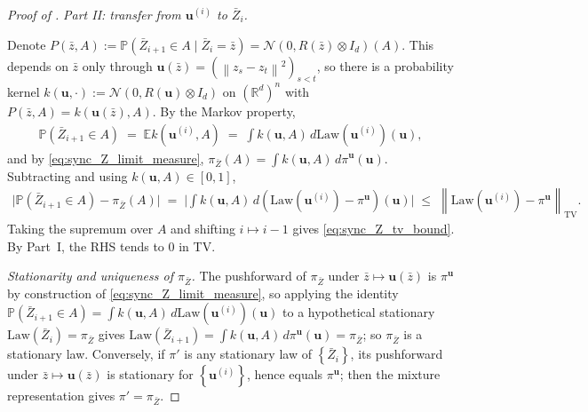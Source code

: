 \documentclass{article}
\newcommand{\RR}{\mathbb{R}}
\newcommand{\Prob}[1]{\mathbb{P}\left( #1 \right)}
\newcommand{\Set}[1]{\left\{ #1 \right\}}
\newcommand{\Exp}[1]{\mathbb{E} #1}
\newcommand{\norm}[1]{\left\|#1\right\|}
\newcommand{\cond}{\mid}
\newcommand{\mcN}{\mathcal{N}}
\newcommand{\bZ}{\bar{Z}}
\newcommand{\bz}{\bar{z}}
\newcommand{\bu}{\mathbf{u}}
\newcommand{\Law}{\mathrm{Law}}
\begin{document}
\begin{proof}[Proof of ]
  \emph{Part II: transfer from $\bu^{(i)}$ to $\bZ_i$.}

  Denote $P(\bz, A) := \Prob{\bZ_{i+1} \in A \cond \bZ_i = \bz} = \mcN(0, R(\bz) \otimes I_d)(A)$. This depends on $\bz$ only through $\bu(\bz) = (\norm{z_s - z_t}^2)_{s<t}$, so there is a probability kernel $k(\bu, \cdot) := \mcN(0, R(\bu) \otimes I_d)$ on $(\RR^d)^n$ with $P(\bz, A) = k(\bu(\bz), A)$. By the Markov property,
  \begin{eqnarray*}
    \Prob{\bZ_{i+1} \in A} \;=\; \Exp{k(\bu^{(i)}, A)} \;=\; \int k(\bu, A)\, d\Law(\bu^{(i)})(\bu),
  \end{eqnarray*}
  and by \eqref{eq:sync_Z_limit_measure}, $\pi_{\bZ}(A) = \int k(\bu, A)\, d\pi^{\bu}(\bu)$. Subtracting and using $k(\bu, A) \in [0, 1]$,
  \begin{eqnarray*}
    \bigl|\Prob{\bZ_{i+1} \in A} - \pi_{\bZ}(A)\bigr| \;=\; \Big|\!\int k(\bu, A)\, d(\Law(\bu^{(i)}) - \pi^{\bu})(\bu)\Big| \;\le\; \norm{\Law(\bu^{(i)}) - \pi^{\bu}}_{\mathrm{TV}}.
  \end{eqnarray*}
  Taking the supremum over $A$ and shifting $i \mapsto i-1$ gives \eqref{eq:sync_Z_tv_bound}. By Part~I, the RHS tends to $0$ in TV.

  \emph{Stationarity and uniqueness of $\pi_{\bZ}$.} The pushforward of $\pi_{\bZ}$ under $\bz \mapsto \bu(\bz)$ is $\pi^{\bu}$ by construction of \eqref{eq:sync_Z_limit_measure}, so applying the identity $\Prob{\bZ_{i+1} \in A} = \int k(\bu, A)\, d\Law(\bu^{(i)})(\bu)$ to a hypothetical stationary $\Law(\bZ_i) = \pi_{\bZ}$ gives $\Law(\bZ_{i+1}) = \int k(\bu, A)\, d\pi^{\bu}(\bu) = \pi_{\bZ}$; so $\pi_{\bZ}$ is a stationary law. Conversely, if $\pi'$ is any stationary law of $\Set{\bZ_i}$, its pushforward under $\bz \mapsto \bu(\bz)$ is stationary for $\Set{\bu^{(i)}}$, hence equals $\pi^{\bu}$; then the mixture representation gives $\pi' = \pi_{\bZ}$.
\end{proof}
\end{document}
